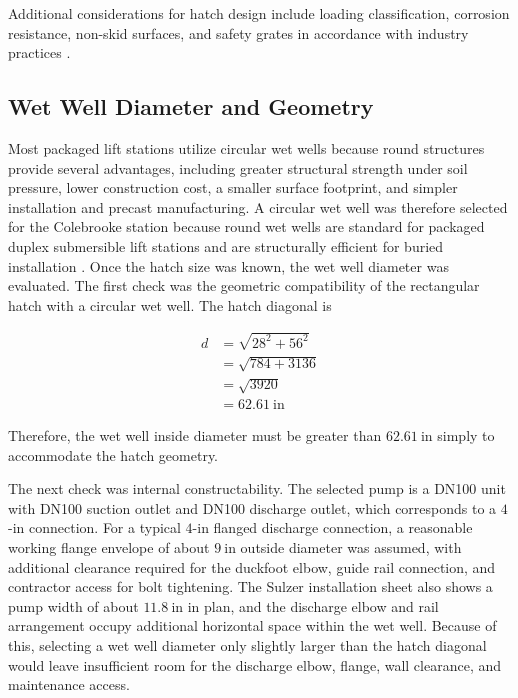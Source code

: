 Additional considerations for hatch design include loading classification, corrosion resistance, non-skid surfaces, and safety grates in accordance with industry practices \cite{Jensen_PumpStationDesignGuidelines_2012}.

\subsection{Wet Well Diameter and Geometry}

Most packaged lift stations utilize circular wet wells because round structures provide several advantages, including greater structural strength under soil pressure, lower construction cost, a smaller surface footprint, and simpler installation and precast manufacturing. A circular wet well was therefore selected for the Colebrooke station because round wet wells are standard for packaged duplex submersible lift stations and are structurally efficient for buried installation \cite{Jensen_PumpStationDesignGuidelines_2012}. Once the hatch size was known, the wet well diameter was evaluated. The first check was the geometric compatibility of the rectangular hatch with a circular wet well. The hatch diagonal is

\[
\begin{aligned}
d &= \sqrt{28^2+56^2} \\
&= \sqrt{784+3136} \\
&= \sqrt{3920} \\
&= 62.61~\text{in}
\end{aligned}
\]

Therefore, the wet well inside diameter must be greater than $62.61~\text{in}$ simply to accommodate the hatch geometry.

The next check was internal constructability. The selected pump is a DN100 unit with DN100 suction outlet and DN100 discharge outlet, which corresponds to a $4$-in connection. For a typical $4$-in flanged discharge connection, a reasonable working flange envelope of about $9~\text{in}$ outside diameter was assumed, with additional clearance required for the duckfoot elbow, guide rail connection, and contractor access for bolt tightening. The Sulzer installation sheet also shows a pump width of about $11.8~\text{in}$ in plan, and the discharge elbow and rail arrangement occupy additional horizontal space within the wet well. Because of this, selecting a wet well diameter only slightly larger than the hatch diagonal would leave insufficient room for the discharge elbow, flange, wall clearance, and maintenance access.

